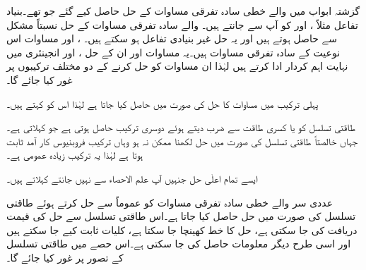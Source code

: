 گزشتہ ابواب میں  والے خطی سادہ تفرقی مساوات کے حل حاصل کیے گئے جو  تھے۔بنیاد تفاعل مثلاً ،  اور  کو آپ  سے جانتے ہیں۔ والے سادہ تفرقی مساوات کے حل نسبتاً مشکل سے حاصل ہوتے ہیں اور یہ حل غیر بنیادی تفاعل ہو سکتے ہیں۔ ،  اور  مساوات اس نوعیت کے سادہ تفرقی مساوات ہیں۔یہ مساوات اور ان کے حل ،  اور  انجینئری میں نہایت اہم کردار ادا کرتے ہیں لہٰذا ان مساوات کو حل کرنے کے دو مختلف ترکیبوں پر غور کیا جائے گا۔

پہلی ترکیب میں مساوات کا حل   کی صورت میں حاصل کیا جاتا ہے لہٰذا اس کو  کہتے ہیں۔

طاقتی تسلسل کو  یا کسری طاقت  سے ضرب دیتے ہوئے دوسری ترکیب حاصل ہوتی ہے جو  کہلاتی ہے۔جہاں خالصتاً طاقتی تسلسل کی صورت میں حل لکھنا ممکن نہ ہو وہاں ترکیب فروبنیوس کار آمد ثابت ہوتا ہے لہٰذا یہ ترکیب زیادہ عمومی ہے۔

ایسے تمام اعلٰی حل جنہیں آپ علم الاحصاء سے نہیں جانتے   کہلاتے ہیں۔

 عددی سر والے خطی سادہ تفرقی مساوات کو عموماً  سے حل کرتے ہوئے طاقتی تسلسل کی صورت میں حل حاصل کیا جاتا ہے۔اس طاقتی تسلسل سے حل کی قیمت دریافت کی جا سکتی ہے، حل کا خط کھینچا جا سکتا ہے، کلیات ثابت کیے جا سکتے ہیں اور اسی طرح دیگر معلومات حاصل کی جا سکتی ہے۔اس حصے میں طاقتی تسلسل کے تصور پر غور کیا جائے گا۔

